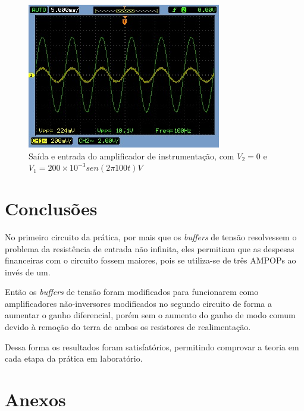 \begin{figure}[H] 
\centering
\includegraphics[scale=0.7]{imagens/AD2MAX_SEM_FILTRO.jpg} 
\caption{Saída e entrada do amplificador de instrumentação, com $V_2=0$ e $V_1=200\times10^{-3} sen(2\pi100t)V$}
\label{p4-out} 
\end{figure}

\section{Conclusões}

No primeiro circuito da prática, por mais que os \textit{buffers} de tensão resolvessem o problema da resistência de entrada não infinita, eles permitiam que as despesas financeiras com o circuito fossem maiores, pois se utiliza-se de três AMPOPs ao invés de um. 

Então os \textit{buffers} de tensão foram modificados para funcionarem como amplificadores não-inversores modificados no segundo circuito de forma a aumentar o ganho diferencial, porém sem o aumento do ganho de modo comum devido à remoção do terra de ambos os resistores de realimentação.

Dessa forma os resultados foram satisfatórios, permitindo comprovar a teoria em cada etapa da prática em laboratório.


\newpage

\section{Anexos}

